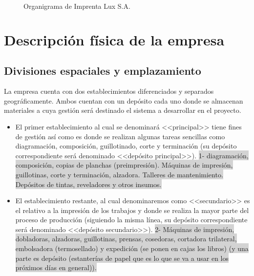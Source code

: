 \documentclass[a4paper, 12pt,twoside]{report}  %
\numberwithin{equation}{subsection} %
\begin{document}
\begin{figure}[h!]
\centering
{%
\setlength{\fboxsep}{0pt}%
\setlength{\fboxrule}{0.5pt}%
%
}%
\caption{Organigrama de Imprenta Lux S.A.}
\label{organigrama}
\end{figure}

\section{Descripción física de la empresa}
\subsection{Divisiones espaciales y emplazamiento}

La empresa cuenta con dos establecimientos diferenciados y separados geográficamente. Ambos cuentan con un depósito cada uno donde se almacenan materiales a cuya gestión será destinado el sistema a desarrollar en el proyecto.
\begin{itemize}
\item El primer establecimiento al cual se denominará <<principal>> tiene fines de gestión así como es donde se realizan algunas tareas sencillas como diagramación, composición, guillotinado, corte y terminación (su depósito correspondiente será denominado <<depósito principal>>).
\colorbox{lightgray}{1- diagramación, composición, copias de planchas (preimpresión). Máquinas de impresión, guillotinas, corte y terminación, alzadora. Talleres de mantenimiento. Depósitos de tintas, reveladores y otros insumos.}
\item El establecimiento restante, al cual denominaremos como <<secundario>> es el relativo a la impresión de los trabajos y donde se realiza la mayor parte del proceso de producción (siguiendo la misma línea, su depósito correspondiente será denominado <<depósito secundario>>).
\colorbox{lightgray}{2- Máquinas de impresión, dobladoras, alzadoras, guillotinas, prensas, cosedoras, cortadora trilateral, embolsadora (termosellado) y expedición (se ponen en cajas los libros) (y una parte es depósito (estanterías de papel que es lo que se va a usar en los próximos días en general)).}
\end{itemize}
\end{document}
